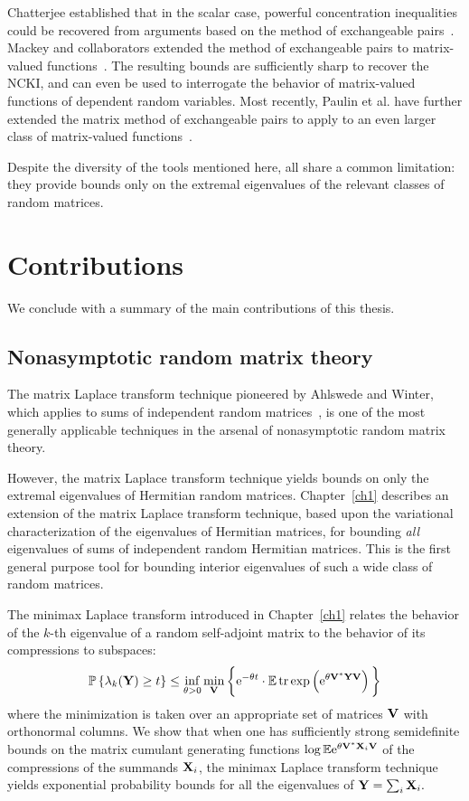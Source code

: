 Chatterjee established that in the scalar case,
powerful concentration inequalities could be recovered from arguments based
on the method of exchangeable pairs~\cite{Chatterjee07}. Mackey and
collaborators extended the method of exchangeable pairs to matrix-valued functions~\cite{MJCFT12}.
The resulting bounds are sufficiently sharp to recover the NCKI, and can even
be used to interrogate the behavior of matrix-valued functions of dependent
random variables. Most recently, Paulin et al. have further extended the 
matrix method of exchangeable pairs to apply to an even larger class of 
matrix-valued functions~\cite{PMT13}.

Despite the diversity of the tools mentioned here, all share a common limitation:
they provide bounds only on the extremal eigenvalues of the relevant classes
of random matrices.

\section{Contributions}

We conclude with a summary of the main contributions of this thesis.

\subsection{Nonasymptotic random matrix theory}

The matrix Laplace transform technique pioneered by 
Ahlswede and Winter, which applies to sums of independent random matrices~\cite{AW02,T10a},
is one of the most generally applicable techniques in the arsenal of nonasymptotic
random matrix theory.

However, the matrix Laplace transform technique yields bounds on only the extremal 
eigenvalues of Hermitian random matrices. Chapter~\ref{ch1} describes an extension of the matrix
Laplace transform technique, based upon the variational characterization of 
the eigenvalues of Hermitian matrices, for bounding \emph{all} eigenvalues of 
sums of independent random Hermitian matrices. This is the first
general purpose tool for bounding interior eigenvalues of such a wide class
of random matrices.

The minimax Laplace transform introduced in Chapter~\ref{ch1} relates the 
behavior of the $k$-th eigenvalue of a random self-adjoint matrix to the 
behavior of its compressions to subspaces:
\[
 \mathbb{P}\left\{\lambda_k(\mathbf{Y}) \geq t\right\} \leq \inf_{\theta > 0} 
 \min_{\mathbf{V}} \bigg\{ \mathrm{e}^{-\theta t} \cdot \mathbb{E} \operatorname{tr}\mathrm{exp}\left(\mathrm{e}^{\theta \mathbf{V}^* \mathbf{Y} \mathbf{V}}\right) \bigg\}
\]
where the minimization is taken over an appropriate set of matrices 
$\mathbf{V}$ with orthonormal columns. We show that when one has sufficiently 
strong semidefinite bounds on the matrix cumulant generating functions 
$\log \mathbb{E} \mathrm{e}^{\theta \mathbf{V}^* \mathbf{X}_i \mathbf{V} }$ of the compressions 
of the summands $\mathbf{X}_i$, the minimax Laplace transform technique yields 
exponential probability bounds for all the eigenvalues of 
$\mathbf{Y} = \sum\nolimits_i \mathbf{X}_i.$

